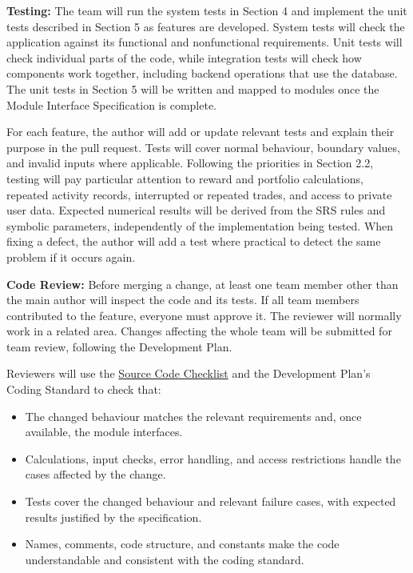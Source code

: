 \documentclass[12pt, titlepage]{article}
\begin{document}
\bigskip
\noindent
\textbf{Testing:} The team will run the system tests in Section 4 and implement the unit tests described in Section 5 as features are developed. System tests will check the application against its functional and nonfunctional requirements. Unit tests will check individual parts of the code, while integration tests will check how components work together, including backend operations that use the database. The unit tests in Section 5 will be written and mapped to modules once the Module Interface Specification is complete.

\medskip
\noindent
For each feature, the author will add or update relevant tests and explain their purpose in the pull request. Tests will cover normal behaviour, boundary values, and invalid inputs where applicable. Following the priorities in Section 2.2, testing will pay particular attention to reward and portfolio calculations, repeated activity records, interrupted or repeated trades, and access to private user data. Expected numerical results will be derived from the SRS rules and symbolic parameters, independently of the implementation being tested. When fixing a defect, the author will add a test where practical to detect the same problem if it occurs again.

\bigskip
\noindent
\textbf{Code Review:} Before merging a change, at least one team member other than the main author will inspect the code and its tests. If all team members contributed to the feature, everyone must approve it. The reviewer will normally work in a related area. Changes affecting the whole team will be submitted for team review, following the Development Plan.

\medskip
\noindent
Reviewers will use the \href{https://github.com/davislenover/BurnNEarn/blob/main/pdfs/Checklists/Code-Checklist.pdf}{Source Code Checklist} and the Development Plan's Coding Standard to check that:
\begin{itemize}
  \item The changed behaviour matches the relevant requirements and, once available, the module interfaces.
  \item Calculations, input checks, error handling, and access restrictions handle the cases affected by the change.
  \item Tests cover the changed behaviour and relevant failure cases, with expected results justified by the specification.
  \item Names, comments, code structure, and constants make the code understandable and consistent with the coding standard.
\end{itemize}
\end{document}
